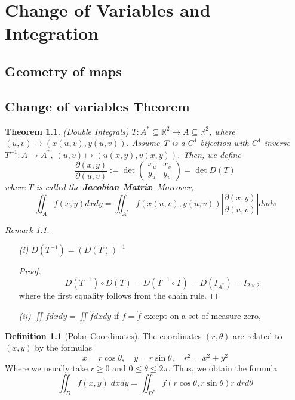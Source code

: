\documentclass[12pt]{book}
\newtheorem{theorem}{Theorem}[section]
\theoremstyle{definition}
\newtheorem{definition}{Definition}[section]
\theoremstyle{remark}
\newtheorem*{remark}{Remark}
\begin{document}
\chapter{Change of Variables and Integration}
\section{Geometry of maps}

\section{Change of variables Theorem}

  \begin{theorem}(Double Integrals) \label{Double Integrals}
    $T: A^* \subseteq \mathbb{R}^2 \to A \subseteq \mathbb{R}^2 $, where $(u,v) \mapsto (x(u,v), y(u,v))$. Assume T is a $C^1$ bijection with $C^1$ inverse $T^{-1}: A \to A^*$, $(u,v) \mapsto (u(x,y), v(x,y))$. Then, we define 
    $$\frac{\partial {(x,y)}}{\partial {(u,v)}} := \det \begin{pmatrix}
      x_u & x_v \\ y_u & y_v 
    \end{pmatrix} = \det D(T) $$
where $T$ is called the \textbf{Jacobian Matrix}. Moreover, 
    $$\iint_A f(x,y) dx dy = \iint_{A^*} f(x(u,v), y(u,v)) \left| \frac{\partial {(x,y)}}{\partial {(u,v)}} \right| du dv  $$
  \end{theorem}
  \begin{remark} 
    $  $ 
    \begin{enumerate}
      \item[\it (i)] $D( T^{-1} ) = (D(T))^{-1}$
      \begin{proof} 
        $$D(T^{-1})\circ D(T) = D(T^{-1} \circ T) = D(I_{A^*}) = I_{2\times 2}$$ where the first equality follows from the chain rule. 
      \end{proof}
      \item[\it (ii)]$\iint f dx dy = \iint \hat{f} dx dy $ if $f = \hat{f}$ except on a set of measure zero, 
    \end{enumerate}
  \end{remark}
  \begin{definition}[Polar Coordinates]
    The coordinates $(r, \theta)$ are related to $(x,y)$ by the formulas
    $$x = r \cos\theta, \quad y = r \sin\theta,\quad r^2 = x^2 + y^2 $$
    Where we usually take $r\geq 0$ and $0\leq \theta \leq 2 \pi.$ Thus, we obtain the formula
    $$\iint_D f(x,y) \; dx dy = \iint_{D^*} f(r \cos \theta, r\sin \theta) r \;dr d\theta$$
    
  \end{definition}
\end{document}
